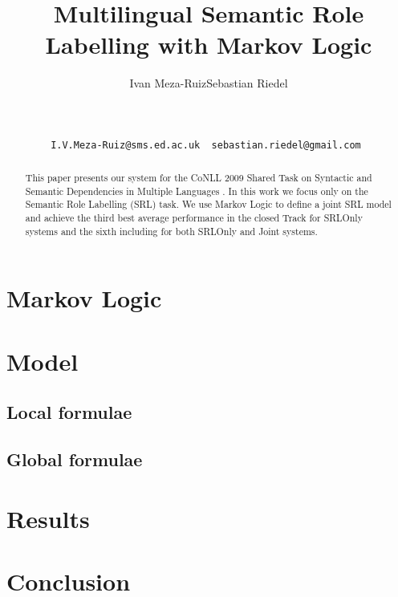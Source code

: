 \documentclass[11pt]{article}
\title{Multilingual Semantic Role Labelling with Markov Logic}
\author{
Ivan Meza-Ruiz\footnotemark[1]  \qquad Sebastian Riedel\footnotemark[2] 
\footnotemark[3]   \\
\footnotemark[1]  {School of Informatics, University of Edinburgh, UK}\\
\footnotemark[2]  {Department of Computer Science, University of Tokyo, Japan}\\
\footnotemark[3]  {Database Center for Life Science, Research Organization of 
Information and System, Japan}\\
\footnotemark[1]  \tt  I.V.Meza-Ruiz@sms.ed.ac.uk \footnotemark[2] \tt 
sebastian.riedel@gmail.com
}
\date{}
\begin{document}
 



\maketitle
\begin{abstract}
This paper presents our system for the CoNLL 2009 Shared
Task on Syntactic and Semantic Dependencies in Multiple
Languages \citep{CoNLL-2009-ST}. In this work we focus only
on the Semantic Role Labelling (SRL) task. We use Markov Logic to define a joint SRL model and achieve
the third best average performance in the closed Track for SRLOnly systems and 
the sixth including for both SRLOnly and Joint systems.
\end{abstract}
\section{Markov Logic} \label{sec:markovlogic}



\section{Model} \label{sec:model} 


\subsection{Local formulae}\label{sec:local} 
 


\subsection{Global formulae}



\section{Results}\label{sec:results}






\section{Conclusion} \label{sec:conclusion}





\end{document}
